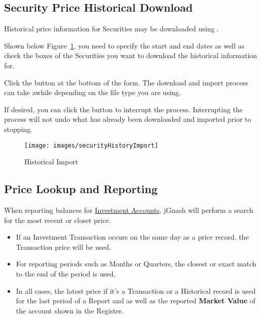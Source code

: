 \documentclass[letterpaper,12pt]{book}
\begin{document}
    
        
           
    \subsection{Security Price Historical Download}
    
    Historical price information for Securities may be downloaded using .
    
    Shown below Figure~\ref{fig:historicalImport}, you need to specify the start and end dates as well as check the boxes of the Securities you
    want to download the historical information for.
    
    Click the  button at the bottom of the form.  The download and import process can take awhile 
    depending on the file type you are using.  
    
    If desired, you can click the  button to interrupt the process.  Interrupting the process will not
    undo what has already been downloaded and imported prior to stopping.
    
    \begin{figure}[h]
        \caption{Historical Import}
        \label{fig:historicalImport}
        \texttt{[image: images/securityHistoryImport]}
    \end{figure}
       
    \newpage   
    \subsection{Price Lookup and Reporting}
    \label{sec:pricelookup}
           
    When reporting balances for \hyperref[sub:investaccount]{Investment Accounts}, jGnash will perform a search
    for the most recent or closet price.
        
    \begin{itemize}
        \item If an Investment Transaction occurs on the same day as a price record, the Transaction price will be used.
        \item For reporting periods such as Months or Quarters, the closest or exact match to the end of the period is used.
        \item  In all cases, the latest price if it's a Transaction or a Historical record is used for the last period 
        of a Report and as well as the reported \textbf{Market Value} of the account shown in the Register.      
    \end{itemize}
      
\end{document}
